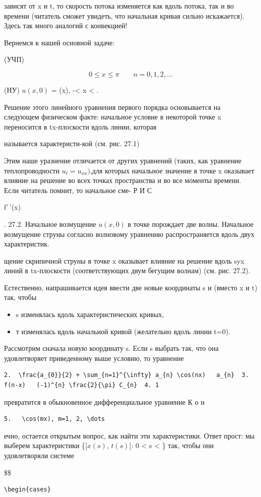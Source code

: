 \documentclass[
  ukrainian,
]{article}
\providecommand{\tightlist}{%
  \setlength{\itemsep}{0pt}\setlength{\parskip}{0pt}}
\begin{document}
зависят от x и t, то скорость потока изменяется как вдоль потока, так и
во времени (читатель сможет увидеть, что начальная кривая сильно
искажается). Здесь так много аналогий с конвекцией!

Вернемся к нашей основной задаче:

(УЧП)

\[
0 \le x \le \pi \qquad n = 0, 1, 2, \dots
\]

(НУ) \(u(x, 0)\) = \varphi(x), -\infty \textless{} x \textless{} \infty.

Решение этого линейного уравнения первого порядка основывается на
следующем физическом факте: начальное условие в некоторой точке x
переносится в tx-плоскости вдоль линии, которая

называется характеристи-кой (см. рис. 27.1)

Этим наше уразнение отличается от других уравнений (таких, как уравнение
теплопроводности \(u_t = u_{xx} )\),для которых начальное значение в
точке x оказывает влияние на решение во всех точках пространства и во
все моменты времени. Если читатель помнит, то начальное сме- Р И С

f'\,'(x)

. 27.2. Начальное возмущение \(u\left(x,0\right)\) в точке порождает две
волны. Начальное возмущение струны согласно волновому уравнению
распространяется вдоль двух характеристик.

щение скрипичной струны в точке x оказывает влияние на решение вдоль
\partial syx линий в tx-плоскости (соответствующих двум бегущим волнам)
(см. рис. 27.2).

Естественно, напрашивается идея ввести две новые координаты s и
\tau   (вместо x и t) так, чтобы

\begin{itemize}
\tightlist
\item
  s изменялась вдоль характеристических кривых,
\item
  т изменялась вдоль начальной кривой (желательно вдоль линии t=0).
\end{itemize}

Рассмотрим сначала новую координату s. Если s выбрать так, что она
удовлетворяет приведенному выше условию, то уравнение

\begin{verbatim}
2.  \frac{a_{0}}{2} + \sum_{n=1}^{\infty} a_{n} \cos(nx)   a_{n}  3.  f(n-x)   (-1)^{n} \frac{2}{\pi} C_{n}  4. 1
\end{verbatim}

превратится в обыкновенное дифференциальное уравнение К о н

\begin{verbatim}
5.   \cos(mx), m=1, 2, \dots 
\end{verbatim}

ечно, остается открытым вопрос, как найти эти характеристики. Ответ
прост: мы выберем характеристики \{{[}\(x(s)\), \(t(s)\){]}: 0
\textless{} s \textless{} \infty\} так, чтобы они удовлетворяли системе

\$\$

\begin{verbatim}
\begin{cases}
\end{verbatim}
\end{document}
